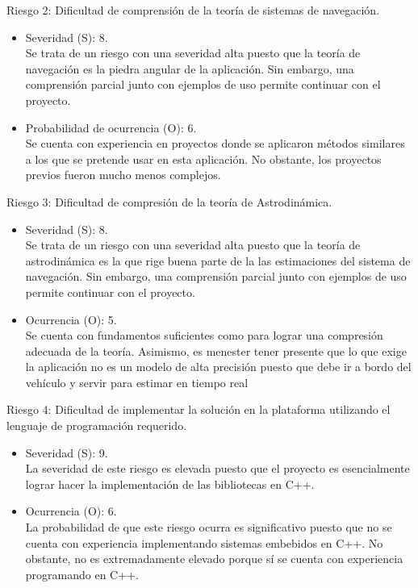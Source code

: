 \documentclass[11pt]{charter}
\begin{document}
Riesgo 2: Dificultad de comprensión de la teoría de sistemas de navegación.
\begin{itemize}
\item Severidad (S): 8.\\
Se trata de un riesgo con una severidad alta puesto que la teoría de navegación es la piedra angular de la aplicación. Sin embargo, una comprensión parcial junto con ejemplos de uso permite continuar con el proyecto.
\item Probabilidad de ocurrencia (O): 6.\\
Se cuenta con experiencia en proyectos donde se aplicaron métodos similares a los que se pretende usar en esta aplicación. No obstante, los proyectos previos fueron mucho menos complejos. 
\end{itemize}   

Riesgo 3: Dificultad de compresión de la teoría de Astrodinámica.
\begin{itemize}
\item Severidad (S): 8. \\
Se trata de un riesgo con una severidad alta puesto que la teoría de astrodinámica es la que rige buena parte de la las estimaciones del sistema de navegación. Sin embargo, una comprensión parcial junto con ejemplos de uso permite continuar con el proyecto.
\item Ocurrencia (O): 5. \\
Se cuenta con fundamentos suficientes como para lograr una compresión adecuada de la teoría. Asimismo, es menester tener presente que lo que exige la aplicación no es un modelo de alta precisión puesto que debe ir a bordo del vehículo y servir para estimar en tiempo real
\end{itemize}

Riesgo 4: Dificultad de implementar la solución en la plataforma utilizando el lenguaje de programación requerido.
\begin{itemize}
\item Severidad (S): 9. \\
La severidad de este riesgo es elevada puesto que el proyecto es esencialmente lograr hacer la implementación de las bibliotecas en C++.
\item Ocurrencia (O): 6. \\
La probabilidad de que este riesgo ocurra es significativo puesto que no se cuenta con experiencia implementando sistemas embebidos en C++. No obstante, no es extremadamente elevado porque sí se cuenta con experiencia programando en C++.
\end{itemize}
\end{document}
